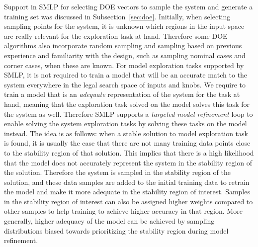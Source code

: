 \documentclass[a4paper,parskip=half]{article} %
\newcommand*\todofb[2][]{\todo[color=cyan!30,tickmarkheight=.2em,size=\scriptsize,#1]{FB: #2}}
\begin{document}
Support in SMLP for selecting DOE vectors to sample the system and generate a training set was discussed in Subsection~\ref{sec:doe}.
Initially, when selecting sampling points for the system, it is unknown which regions in the input space are really relevant for the exploration 
task at hand. Therefore some DOE algorithms also incorporate random sampling and
sampling based on previous experience and familiarity with the design, such as sampling nominal cases and corner cases, when these are known.
For model exploration tasks supported by SMLP, it is not required to train a model that will be an accurate match to the system everywhere in 
the legal search space of inputs and knobs.
We require to train a model that is an \emph{adequate} representation of the system for the task at hand, 
meaning that the exploration task solved on the model solves this task for the system as well.
Therefore SMLP supports a \emph{targeted model refinement} loop to
enable solving the system exploration tasks by solving these tasks on the model instead.
The idea is as follows: when a stable solution to model exploration task is found, it is usually the case that there are not 
many training data points close to the stability region of that solution.
This implies that there is a high likelihood that the model does not accurately represent the system in the stability region of the solution.
Therefore the system is sampled in the stability region of the solution, and these data samples are added to the initial training data to 
retrain the model and make it more adequate in the stability region of interest.
Samples in the stability region of interest can also be assigned higher weights compared to other samples to help training to achieve 
higher accuracy in that region. More generally, higher adequacy of the model can be achieved by sampling distributions biased towards 
prioritizing the stability region during model refinement.
\end{document}
